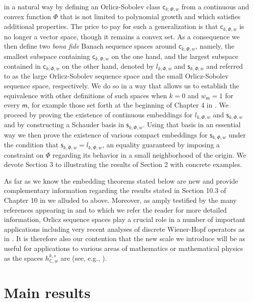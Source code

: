 \documentclass{article}
\begin{document}
in a natural way by defining an Orlicz-Sobolev class $\mathsf{c}_{k,\Phi ,w}$
from a continuous and convex function $\Phi $ that is not limited to
polynomial growth and which satisfies additional properties. The price to
pay for such a generalization is that $\mathsf{c}_{k,\Phi ,w}$ is no longer
a vector space, though it remains a convex set. As a consequence we then
define two \textit{bona fide} Banach sequence spaces around $\mathsf{c}%
_{k,\Phi ,w}$, namely, the smallest subspace containing $\mathsf{c}_{k,\Phi
,w}$ on the one hand, and the largest subspace contained in $\mathsf{c}%
_{k,\Phi ,w}$ on the other hand, denoted by $l_{k,\Phi ,w}$ and $\mathsf{s}%
_{k,\Phi ,w}$ and referred to as the large Orlicz-Sobolev sequence space and
the small Orlicz-Sobolev sequence space, respectively. We do so in a way
that allows us to establish the equivalence with other definitions of such
spaces when $k=0$ and $w_{\mathsf{m}}=1$ for every $\mathsf{m}$, for example
those set forth at the beginning of Chapter 4 in \cite{lindenstrausstra}. We
proceed by proving the existence of continuous embeddings for $l_{k,\Phi ,w}$
and $\mathsf{s}_{k,\Phi ,w}$ and by constructing a Schauder basis in $%
\mathsf{s}_{k,\Phi ,w}$. Using that basis in an essential way we then prove
the existence of various compact embeddings for $\mathsf{s}_{k,\Phi ,w}$
under the condition that $\mathsf{s}_{k,\Phi ,w}=l_{k,\Phi ,w}$, an equality
guaranteed by imposing a constraint on $\Phi $ regarding its behavior in a
small neighborhood of the origin. We devote Section 3 to illustrating the
results of Section 2 with concrete examples.

As far as we know the embedding theorems stated below are new and provide
complementary information regarding the results stated in Section 10.3 of
Chapter 10 in \cite{raoren2} we alluded to above. Moreover, as amply
testified by the many references appearing in \cite{raoren1} and \cite%
{raoren2} to which we refer the reader for more detailed information, Orlicz
sequence spaces play a crucial role in a number of important applications
including very recent analyses of discrete Wiener-Hopf operators as in \cite%
{karlovychthampi}. It is therefore also our contention that the new scale we
introduce will be as useful for applications to various areas of mathematics
or mathematical physics as the spaces $h_{\mathbb{C},w}^{k,s}$ are (see,
e.g., \cite{vuillermotbis}).

\section{Main results}
\end{document}
